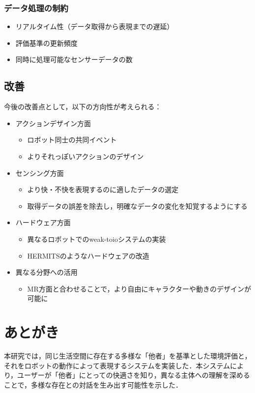 \documentclass[paper=a4paper,jafontsize=9pt,head_space=15mm,gutter=20mm,
twocolumn,number_of_lines=49, line_length=26zw]{myuarticle}
\begin{document}
\subsubsection{データ処理の制約}
\begin{itemize}
  \item リアルタイム性（データ取得から表現までの遅延）
  \item 評価基準の更新頻度
  \item 同時に処理可能なセンサーデータの数
\end{itemize}

\subsection{改善}
今後の改善点として，以下の方向性が考えられる：

\begin{itemize}
  \item アクションデザイン方面
    \begin{itemize}
      \item ロボット同士の共同イベント
      \item よりそれっぽいアクションのデザイン
    \end{itemize}

  \item センシング方面
    \begin{itemize}
      \item より快・不快を表現するのに適したデータの選定
      \item 取得データの誤差を除去し，明確なデータの変化を知覚するようにする
    \end{itemize}

  \item ハードウェア方面
    \begin{itemize}
      \item 異なるロボットでのweak-toioシステムの実装
      \item HERMITSのようなハードウェアの改造\cite{MITTangibleMediaGroup-2020-HERMITS}
    \end{itemize}

  \item 異なる分野への活用
    \begin{itemize}
      \item MR方面と合わせることで，より自由にキャラクターや動きのデザインが可能に
    \end{itemize}
\end{itemize}

\section{あとがき}
本研究では，同じ生活空間に存在する多様な「他者」を基準とした環境評価と，それをロボットの動作によって表現するシステムを実装した．本システムにより，ユーザーが「他者」にとっての快適さを知り，異なる主体への理解を深めることで，多様な存在との対話を生み出す可能性を示した．

\renewcommand{\refname}{　参考文献}


\end{document}
